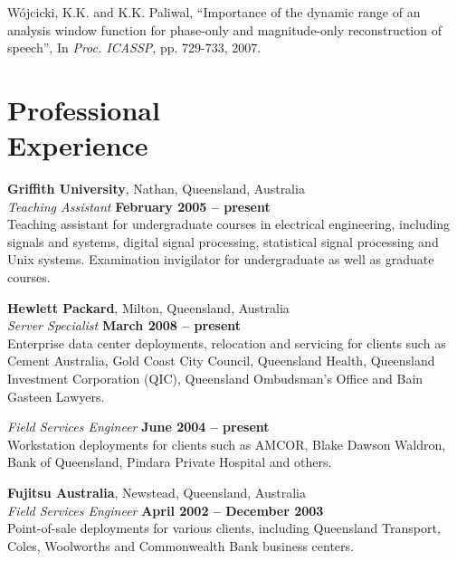 \documentclass[margin,line]{resume}
\begin{document}
\begin{resume}
\vspace{-2mm}
    W\'ojcicki, K.K. and K.K. Paliwal,
    ``Importance of the dynamic range of an analysis window function for phase-only and magnitude-only reconstruction of speech'',
    In \textsl{Proc. ICASSP}, pp. 729-733, 2007.



    \section{\mysidestyle Professional\\Experience}

    \textbf{Griffith University}, Nathan, Queensland, Australia \vspace{2mm}\\\vspace{1mm}%
    \textsl{Teaching Assistant} \hfill \textbf{February 2005 -- present}\\
    Teaching assistant for undergraduate courses in electrical engineering,
    including signals and systems, digital signal processing,
    statistical signal processing and Unix systems.
    Examination invigilator for undergraduate as well as graduate courses.


    \textbf{Hewlett Packard}, Milton, Queensland, Australia \vspace{2mm}\\\vspace{1mm}%
    \textsl{Server Specialist} \hfill \textbf{March 2008 -- present}\\
    Enterprise data center deployments, relocation and servicing
    for clients such as Cement Australia, Gold Coast City Council, Queensland Health,
    Queensland Investment Corporation (QIC), Queensland Ombudsman's Office and Bain Gasteen Lawyers.

    \textsl{Field Services Engineer} \hfill \textbf{June 2004 -- present}\vspace{1.5mm}\\\vspace{0mm}%
    Workstation deployments for clients such as AMCOR,
    Blake Dawson Waldron, Bank of Queensland, Pindara Private Hospital and others.

    \textbf{Fujitsu Australia}, Newstead, Queensland, Australia \vspace{2mm}\\\vspace{1mm}%
    \textsl{Field Services Engineer} \hfill \textbf{April 2002 -- December 2003}\\
    Point-of-sale deployments for various clients,
    including Queensland Transport, Coles, Woolworths and Commonwealth Bank business centers.




\end{resume}
\end{document}
